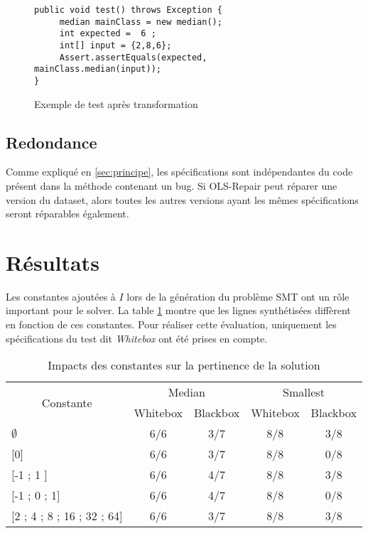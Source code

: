 \begin{figure}
\begin{lstlisting}
public void test() throws Exception {
     median mainClass = new median();
     int expected =  6 ;
     int[] input = {2,8,6};
     Assert.assertEquals(expected, mainClass.median(input));
}
\end{lstlisting}
\label{fig:dataset_apres_transfo}
\caption{Exemple de test après transformation}
\end{figure}

\subsection{Redondance}

Comme expliqué en \ref{sec:principe}, les spécifications sont indépendantes du code présent dans la méthode contenant un bug. Si OLS-Repair peut réparer une version du dataset, alors toutes les autres versions ayant les mêmes spécifications seront réparables également.

\section{Résultats}

Les constantes ajoutées à $I$ lors de la génération du problème SMT ont un rôle important pour le solver. La table \ref{table:constantes} montre que les lignes synthétisées diffèrent en fonction de ces constantes. Pour réaliser cette évaluation, uniquement les spécifications du test dit \textit{Whitebox} ont été prises en compte.  

\begin{table}[H]
\centering
\begin{tabular}{|l|c|c|c|c|}
\hline
\multicolumn{1}{|c|}{\multirow{2}{*}{Constante}} & \multicolumn{2}{c|}{Median} & \multicolumn{2}{c|}{Smallest} \\ \cline{2-5} 
\multicolumn{1}{|c|}{}                           & Whitebox     & Blackbox     & Whitebox      & Blackbox      \\ \hline
$\emptyset$                                           & 6/6          & 3/7          & 8/8           & 3/8           \\ \hline
{[}0{]}                                          & 6/6          & 3/7          & 8/8           & 0/8           \\ \hline
{[}-1 ; 1 {]}                                    & 6/6          & 4/7          & 8/8           & 3/8           \\ \hline
{[}-1 ; 0 ; 1{]}                                 & 6/6          & 4/7          & 8/8           & 0/8           \\ \hline
{[}2 ; 4 ; 8 ; 16 ; 32 ; 64{]}                   & 6/6          & 3/7          & 8/8           & 3/8           \\ \hline
\end{tabular}
\caption{Impacts des constantes sur la pertinence de la solution}
\label{table:constantes}
\end{table}

